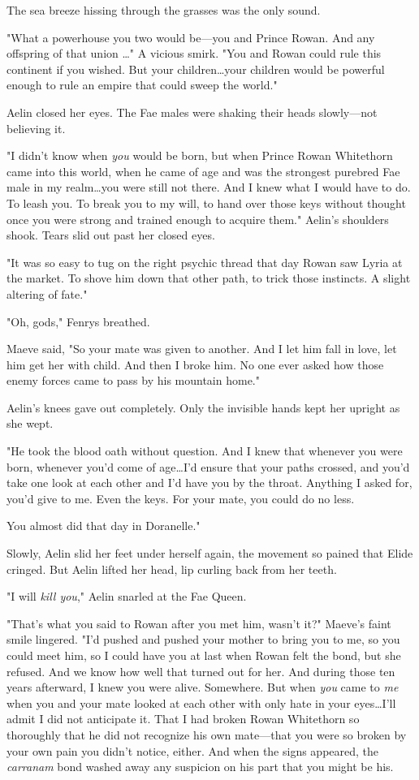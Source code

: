 The sea breeze hissing through the grasses was the only sound.

"What a powerhouse you two would be---you and Prince Rowan.
And any offspring of that union \ldots" A vicious smirk.
"You and Rowan could rule this continent if you wished.
But your children\ldots your children would be powerful enough to rule an empire that could sweep the world."

Aelin closed her eyes.
The Fae males were shaking their heads slowly---not believing it.

"I didn't know when \emph{you} would be born, but when Prince Rowan Whitethorn came into this world, when he came of age and was the strongest purebred Fae male in my realm\ldots you were still not there.
And I knew what I would have to do.
To leash you.
To break you to my will, to hand over those keys without thought once you were strong and trained enough to acquire them."
Aelin's shoulders shook.
Tears slid out past her closed eyes.

"It was so easy to tug on the right psychic thread that day Rowan saw Lyria at the market.
To shove him down that other path, to trick those instincts.
A slight altering of fate."

"Oh, gods," Fenrys breathed.

Maeve said, "So your mate was given to another.
And I let him fall in love, let him get her with child.
And then I broke him.
No one ever asked how those enemy forces came to pass by his mountain home."

Aelin's knees gave out completely.
Only the invisible hands kept her upright as she wept.

"He took the blood oath without question.
And I knew that whenever you were born, whenever you'd come of age\ldots I'd ensure that your paths crossed, and you'd take one look at each other and I'd have you by the throat.
Anything I asked for, you'd give to me.
Even the keys.
For your mate, you could do no less.

You almost did that day in Doranelle."

Slowly, Aelin slid her feet under herself again, the movement so pained that Elide cringed.
But Aelin lifted her head, lip curling back from her teeth.

"I will \emph{kill you}," Aelin snarled at the Fae Queen.

"That's what you said to Rowan after you met him, wasn't it?"
Maeve's faint smile lingered.
"I'd pushed and pushed your mother to bring you to me, so you could meet him, so I could have you at last when Rowan felt the bond, but she refused.
And we know how well that turned out for her.
And during those ten years afterward, I knew you were alive.
Somewhere.
But when \emph{you} came to \emph{me}  when you and your mate looked at each other with only hate in your eyes\ldots I'll admit I did not anticipate it.
That I had broken Rowan Whitethorn so thoroughly that he did not recognize his own mate---that you were so broken by your own pain you didn't notice, either.
And when the signs appeared, the \emph{carranam} bond washed away any suspicion on his part that you might be his.

